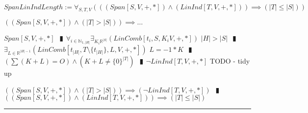 \documentclass{book}
\newcommand{\abr}{:=}
\newcommand{\pipe}{$\phantom{(}\vrectangleblack\phantom{)}$}
\newcommand{\pr}[1]{\left(#1\right)}
\begin{document}
\begin{comment}
  \begin{shaded} %
  $SubDirSum \abr \forall_{U, V}\pr{\pr{(FinDim[V, +, *]) \land (Subspace[U, V, +, *])} \implies \pr{\exists_{W}\pr{(Subspace[W, V, +, *]) \land (DirSum[V, U, W, V, +, *])}}}$
  \begin{enumerate}
    \lit $FinSubSpace$ \pipe $FinDim[U, +, *]$
    \lit $(FinDimBasis) \land (FinDim[U, +, *])$ \pipe $\exists_{B}(Basis[B, U, +, *])$ \pipe $LinInd[B, U, +, *]$ \pipe $LinInd[B, V, +, *]$ NEWTHM
    \lit $(LinIndExpandBasis) \land (LinInd[B, V, +, *])$ \pipe $\exists_{C}\pr{(B \subseteq C) \land (Basis[C, V, +, *])}$
    \lit $(LinSpanSubContains) \land (W \abr LinSpan[C \setminus B])$ \pipe $Subspace[W, V, +, *]$
    \lit $(v \in V) \implies \ldots$
    \begin{enumerate}
      \lit $v = \sum(r_i * c_i) = \sum(r_i * w_i) + \sum(r_i * b_i) \in W + U)$
    \end{enumerate}
    \lit $(v \in V) \implies (v \in U + W)$ \pipe $\forall_{v \in V}(v \in U + W)$ \pipe $SetSum[V, U, W, V +, *]$
    \lit $(v \in U \cap W) \implies \ldots$
    \begin{enumerate}
      \lit TODO : $LinInd$ \pipe $\ldots v = O$
    \end{enumerate}
    \lit $(v \in U \cap W) \iff (v = O)$ \pipe $U \cap W = \{O\}$
    \lit $(SetSum[V, U, W, V +, *]) \land (U \cap W = \{O\})$
    \lit $DirSumEquiv$ \pipe $DirSum[V, U, W, V, +, *]$
  \end{enumerate} \vspace{.75mm} \hrule \vspace{.75mm} \ \\ 
  \end{shaded} %
\end{comment}

$SpanLinIndLength \abr \forall_{S, T, V}\pr{\pr{(Span[S, V, +, *]) \land (LinInd[T, V, +, *])} \implies (|T| \leq |S|)}$
\begin{enumerate}
  \lit $\pr{(Span[S, V, +, *]) \land (|T| > |S|)} \implies \ldots$
  \begin{enumerate}
    \lit $Span[S, V, +, *]$ \pipe $\forall_{i \in \mathbb{N}_{1, |H|}} \exists_{K_i \mathbb{R}^{|S|}}(LinComb[t_i, S, K_i V, +, *])$
    \lit $|H| > |S|$ \pipe $\exists_{L \in \mathbb{R}^{|H| - 1}}(LinComb[t_{|H|}, T \setminus \{t_{|H|}\}, L, V, +, *])$
    \lit $L = -1 * K$ \pipe $\pr{\sum(K + L) = O} \land (K + L \neq \{0\}^{|T|})$ \pipe $\lnot LinInd[T, V, +, *]$
    \lit TODO - tidy up
  \end{enumerate}
  \lit $\pr{(Span[S, V, +, *]) \land (|T| > |S|)} \implies (\lnot LinInd[T, V, +, *])$ \pipe $\pr{(Span[S, V, +, *]) \land (LinInd[T, V, +, *])} \implies (|T| \leq |S|)$
\end{enumerate} \vspace{.75mm} \hrule \vspace{.75mm} \  \\
\end{document}
